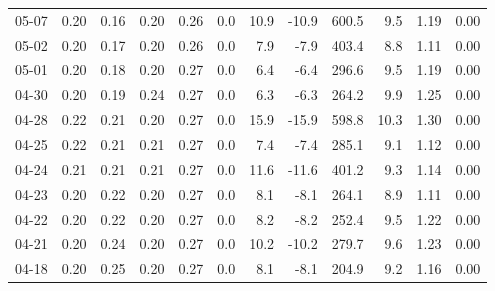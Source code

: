 \begin{threeparttable}
{\begin{tabular}{lrrrrrrrrrrr}
  05-07 &          0.20 &          0.16 &          0.20 &        0.26 &                 0.0 &                10.9 &      -10.9 &               600.5 &              9.5 &            1.19 &                   0.00 \\
  05-02 &          0.20 &          0.17 &          0.20 &        0.26 &                 0.0 &                 7.9 &       -7.9 &               403.4 &              8.8 &            1.11 &                   0.00 \\
  05-01 &          0.20 &          0.18 &          0.20 &        0.27 &                 0.0 &                 6.4 &       -6.4 &               296.6 &              9.5 &            1.19 &                   0.00 \\
  04-30 &          0.20 &          0.19 &          0.24 &        0.27 &                 0.0 &                 6.3 &       -6.3 &               264.2 &              9.9 &            1.25 &                   0.00 \\
  04-28 &          0.22 &          0.21 &          0.20 &        0.27 &                 0.0 &                15.9 &      -15.9 &               598.8 &             10.3 &            1.30 &                   0.00 \\
  04-25 &          0.22 &          0.21 &          0.21 &        0.27 &                 0.0 &                 7.4 &       -7.4 &               285.1 &              9.1 &            1.12 &                   0.00 \\
  04-24 &          0.21 &          0.21 &          0.21 &        0.27 &                 0.0 &                11.6 &      -11.6 &               401.2 &              9.3 &            1.14 &                   0.00 \\
  04-23 &          0.20 &          0.22 &          0.20 &        0.27 &                 0.0 &                 8.1 &       -8.1 &               264.1 &              8.9 &            1.11 &                   0.00 \\
  04-22 &          0.20 &          0.22 &          0.20 &        0.27 &                 0.0 &                 8.2 &       -8.2 &               252.4 &              9.5 &            1.22 &                   0.00 \\
  04-21 &          0.20 &          0.24 &          0.20 &        0.27 &                 0.0 &                10.2 &      -10.2 &               279.7 &              9.6 &            1.23 &                   0.00 \\
  04-18 &          0.20 &          0.25 &          0.20 &        0.27 &                 0.0 &                 8.1 &       -8.1 &               204.9 &              9.2 &            1.16 &                   0.00 \\

\end{tabular}}
\end{threeparttable}
